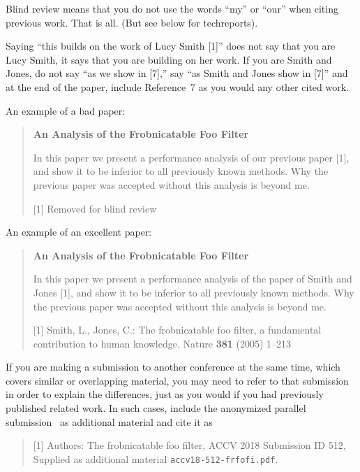 \documentclass[runningheads]{llncs}
\begin{document}
Blind review means that you do not use the words ``my'' or ``our''
when citing previous work.  That is all.  (But see below for 
techreports).

Saying ``this builds on the work of Lucy Smith [1]'' does not say
that you are Lucy Smith, it says that you are building on her
work.  If you are Smith and Jones, do not say ``as we show in
[7],'' say ``as Smith and Jones show in [7]'' and at the end of the
paper, include Reference~7 as you would any other cited work.

An example of a bad paper:
\begin{quote}
\begin{center}
    {\bf An Analysis of the Frobnicatable Foo Filter}
\end{center}
   
   In this paper we present a performance analysis of our
   previous paper [1], and show it to be inferior to all
   previously known methods.  Why the previous paper was
   accepted without this analysis is beyond me.
   
   [1] Removed for blind review
\end{quote}
   
An example of an excellent paper:   
   
\begin{quote}
\begin{center}
     {\bf An Analysis of the Frobnicatable Foo Filter}
\end{center}
   
   In this paper we present a performance analysis of the
   paper of Smith and Jones [1], and show it to be inferior to
   all previously known methods.  Why the previous paper
   was accepted without this analysis is beyond me.
   
   [1] Smith, L., Jones, C.: The frobnicatable foo
   filter, a fundamental contribution to human knowledge.
   Nature {\bf 381} (2005) 1--213
\end{quote}
   
If you are making a submission to another conference at the same time,
which covers similar or overlapping material, you may need to refer to that
submission in order to explain the differences, just as you would if you
had previously published related work.  In such cases, include the
anonymized parallel submission~\cite{Authors18} as additional material and
cite it as
\begin{quote}
[1]  Authors: The frobnicatable foo filter, ACCV 2018 Submission ID 512,
Supplied as additional material {\tt accv18-512-frfofi.pdf}.
\end{quote}
\end{document}
